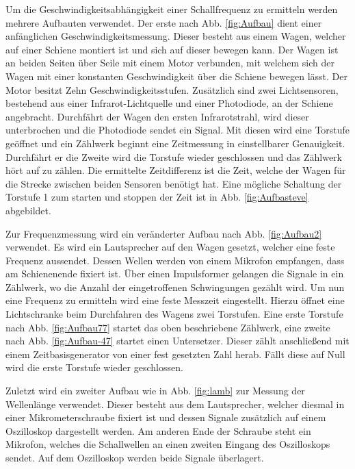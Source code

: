 Um die Geschwindigkeitsabhängigkeit einer Schallfrequenz zu ermitteln werden mehrere Aufbauten verwendet.
  Der erste nach Abb. \ref{fig:Aufbau} dient einer anfänglichen Geschwindigkeitsmessung. Dieser besteht aus einem Wagen, welcher
   auf einer Schiene montiert ist und sich auf dieser bewegen kann.
 Der Wagen ist an beiden Seiten über Seile  mit einem Motor verbunden, mit welchem sich
  der Wagen mit einer konstanten Geschwindigkeit über die Schiene bewegen lässt.
   Der Motor besitzt Zehn Geschwindigkeitsstufen.
Zusätzlich sind zwei Lichtsensoren, bestehend aus einer Infrarot-Lichtquelle und
 einer Photodiode, an der Schiene angebracht.
    Durchfährt der Wagen
 den ersten Infrarotstrahl, wird dieser unterbrochen und die Photodiode sendet ein Signal.
 Mit diesen wird eine Torstufe geöffnet und ein Zählwerk beginnt eine Zeitmessung in einstellbarer Genauigkeit. Durchfährt er die Zweite wird die Torstufe wieder
  geschlossen und das Zählwerk hört auf zu zählen. Die ermittelte Zeitdifferenz ist die Zeit, welche der Wagen für die Strecke zwischen beiden Sensoren benötigt hat.
    Eine mögliche Schaltung der Torstufe 1 zum starten und stoppen der Zeit ist in Abb. \ref{fig:Aufbasteve} abgebildet.


  Zur Frequenzmessung wird ein veränderter Aufbau nach Abb. \ref{fig:Aufbau2} verwendet. Es wird ein Lautsprecher auf den Wagen gesetzt,
   welcher eine feste Frequenz aussendet. Dessen Wellen werden von einem Mikrofon empfangen, dass am
  Schienenende fixiert ist. Über einen Impulsformer gelangen die Signale in ein Zählwerk, wo die Anzahl der eingetroffenen Schwingungen gezählt wird.
   Um nun eine Frequenz zu ermitteln wird eine feste Messzeit eingestellt. Hierzu öffnet
   eine Lichtschranke beim Durchfahren des Wagens zwei Torstufen. Eine erste Torstufe nach Abb. \ref{fig:Aufbau77}
    startet das oben beschriebene Zählwerk, eine zweite nach Abb. \ref{fig:Aufbau-47} startet einen Untersetzer.
     Dieser zählt anschließend mit einem Zeitbasisgenerator von einer fest gesetzten Zahl herab.
      Fällt diese auf Null wird die erste Torstufe wieder geschlossen.


       Zuletzt wird ein zweiter Aufbau wie in Abb. \ref{fig:lamb} zur Messung der Wellenlänge verwendet.
       Dieser besteht aus dem Lautsprecher, welcher diesmal in einer Mikrometerschraube fixiert
        ist und dessen Signale zusätzlich auf einem Oszilloskop dargestellt werden.
        Am anderen Ende der Schraube steht ein Mikrofon, welches die Schallwellen an einen zweiten Eingang
         des Oszilloskops sendet. Auf dem Oszilloskop werden beide Signale überlagert.
